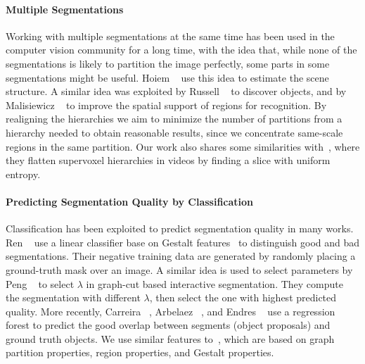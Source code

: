 \paragraph{Multiple Segmentations}
Working with multiple segmentations at the same time has been used in the computer vision community
for a long time, with the idea that, while none of the segmentations is likely to partition the image perfectly, some parts in some segmentations might be useful.
Hoiem \etal~\citep{hoiem2005geometric} use this idea to estimate the scene structure.
A similar idea was exploited by Russell \etal~\citep{russell2006using} to discover objects,
and by Malisiewicz \etal~\citep{malisiewicz2007improving} to improve the spatial support of regions for
recognition.
By realigning the hierarchies we aim to minimize the number of partitions from a hierarchy needed to obtain
reasonable results, since we concentrate same-scale regions in the same partition.
Our work also shares some similarities with~\citep{xu2013flattening}, where they flatten supervoxel
hierarchies in videos by finding a slice with uniform entropy.


\paragraph{Predicting Segmentation Quality by Classification}
Classification has been exploited to predict segmentation quality in many works.
Ren \etal~\citep{ren2003learning} use a linear classifier base on Gestalt features~\citep{palmer1999vision}
to distinguish good and bad segmentations.
Their negative training data are generated by randomly placing a ground-truth mask over an image.
A similar idea is used to select parameters by Peng \etal~\citep{peng2008parameter} to select $\lambda$ in 
graph-cut based interactive segmentation.
They compute the segmentation with different $\lambda$, then select the one with highest predicted quality. 
More recently, Carreira \etal~\citep{carreira2010constrained}, Arbelaez \etal~\citep{MCG},
and Endres \etal~\citep{Endres2014} use a regression forest to predict the good overlap between
segments (object proposals) and ground truth objects.
We use similar features to~\citep{carreira2010constrained}, which are based on graph partition properties,
region properties, and Gestalt properties.

